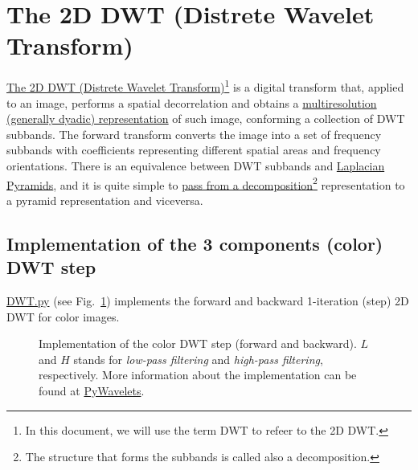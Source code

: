 \section{The 2D DWT (Distrete Wavelet Transform)}
\href{https://vicente-gonzalez-ruiz.github.io/image_transformations_for_coding/#x1-3100020}{The
  2D DWT (Distrete Wavelet Transform)\footnote{In this document, we will use the term DWT to refeer to
    the 2D DWT.}} is a digital
transform that, applied to an image, performs a spatial decorrelation
and obtains a
\href{https://vicente-gonzalez-ruiz.github.io/image_transformations_for_coding/index.html#x1-3500024}{multiresolution
  (generally dyadic) representation} of such image, conforming a
collection of DWT subbands. The forward transform converts the image
into a set of frequency subbands with coefficients representing
different spatial areas and frequency orientations. There is an
equivalence between DWT subbands and
\href{http://fourier.eng.hmc.edu/e161/lectures/canny/node3.html}{Laplacian
  Pyramids}, and it is quite simple to
\href{https://vicente-gonzalez-ruiz.github.io/pyramids-and-wavelets/}{pass
  from a decomposition\footnote{The structure that forms the subbands
    is called also a decomposition.} representation to a pyramid
  representation and viceversa}.

\subsection{Implementation of the 3 components (color) DWT step}
\href{https://github.com/vicente-gonzalez-ruiz/MCDWT/blob/master/src/DWT.py}{DWT.py}
(see Fig.~\ref{fig:DWT}) implements the forward and backward
1-iteration (step) 2D DWT for color images.

\begin{figure}
  
  
  \caption{Implementation of the color DWT step (forward and
    backward). $L$ and $H$ stands for \emph{low-pass filtering} and
    \emph{high-pass filtering}, respectively.  More information about the
    implementation can be found at
    \href{https://pywavelets.readthedocs.io/en/latest/index.html}{PyWavelets}.}
  \label{fig:DWT}
\end{figure}

